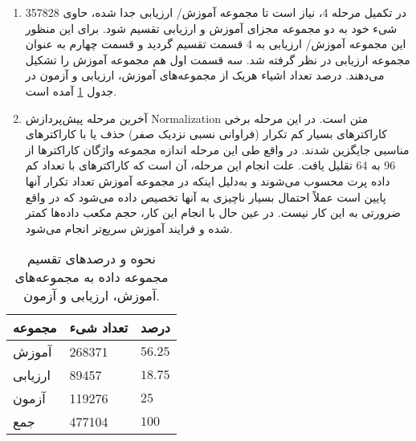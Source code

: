 \begin{enumerate}
{}

\item {
	در تکمیل مرحله 4، نیاز است تا مجموعه آموزش/ ارزیابی جدا شده، حاوی 357828 شیء خود به دو مجموعه مجزای آموزش و ارزیابی تقسیم شود. برای این منظور این مجموعه آموزش/ ارزیابی به 4 قسمت تقسیم گردید و قسمت چهارم به عنوان مجموعه ارزیابی در نظر گرفته شد. سه قسمت اول هم مجموعه آموزش را تشکیل می‌دهند. درصد‌ تعداد اشیاء هریک از مجموعه‌های آموزش، ارزیابی و آزمون در جدول \ref{tabel:dataset_divding_percentage} آمده است.

}

\item {
	آخرین مرحله پیش‌پردازش \gls{Normalization} متن است. در این مرحله برخی کاراکترهای بسیار کم تکرار (فراوانی نسبی نزدیک صفر) حذف یا با کاراکترهای مناسبی جایگزین شدند. در واقع طی این مرحله اندازه مجموعه واژگان کاراکترها از 96 به 64 تقلیل یافت. علت انجام این مرحله، آن است که کاراکترهای با تعداد کم داده پرت محسوب می‌شوند و به‌دلیل اینکه در مجموعه آموزش تعداد تکرار آنها پایین است عملاً احتمال بسیار ناچیزی به آنها تخصیص داده می‌شود که در واقع ضرورتی به این کار نیست. در عین حال با انجام این کار، حجم مکعب داده‌ها کمتر شده و فرایند آموزش سریع‌تر انجام می‌شود.\\
	
}

 \end{enumerate}
 
 \begin{table}%
 	\caption[نحوه و درصد‌های تقسیم مجموعه داده به مجموعه‌های آموزش، ارزیابی و آزمون]
 	{
 		نحوه و درصد‌های تقسیم مجموعه داده به مجموعه‌های آموزش، ارزیابی و آزمون.
 	}
 	\label{tabel:dataset_divding_percentage}
 	\centering
 	\onehalfspacing
 	\begin{tabularx}{0.5\linewidth}{p{20mm} p{20mm} p{20mm}}
 		
 		\toprule[1.5pt]  مجموعه & تعداد شیء & درصد
 		\\
 		\midrule[1.5pt] آموزش & 268371 & $56.25  $
 		\\
 		 ارزیابی & 89457 & $ 18.75 $
 		\\
 		 آزمون & 119276 & $ 25$ 
 		\\
 		\hline
 		 جمع & 477104 & $ 100$ 
 		\\
 		\bottomrule[1.5pt]
 		
 	\end{tabularx} 
 \end{table}
 
 
 

